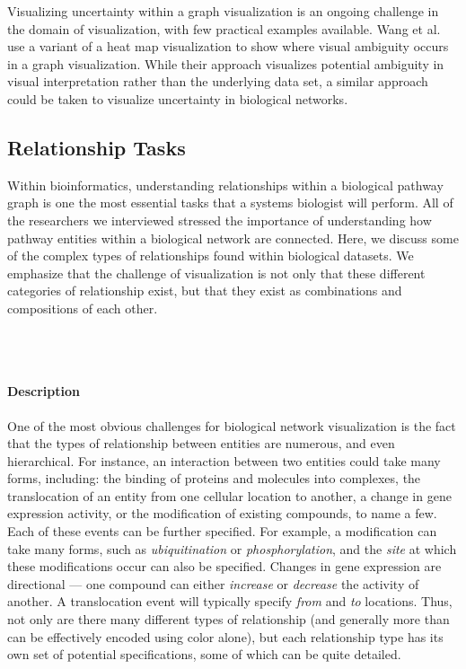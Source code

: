 \documentclass[twocolumn]{bmcart}%
\begin{document}
Visualizing uncertainty within a graph visualization is an ongoing challenge in the domain of visualization, with few practical examples available.
Wang et al.~\cite{wang2016ambiguityvis} use a variant of a heat map visualization to show where visual ambiguity occurs in a graph visualization.
While their approach visualizes potential ambiguity in visual interpretation rather than the underlying data set, a similar approach could be taken to visualize uncertainty in biological networks.

\subsection*{Relationship Tasks}

Within bioinformatics,  understanding relationships within a biological pathway graph is one the most essential tasks that a systems biologist will perform.
All of the researchers we interviewed stressed the importance of understanding how pathway entities within a biological network are connected.
Here, we discuss some of the complex types of relationships found within biological datasets.
We emphasize that the challenge of visualization is not only that these different categories of relationship exist, but that they exist as combinations and compositions of each other.

\ \\ \

\paragraph*{Description}

One of the most obvious challenges for biological network visualization is the fact that the types of relationship between entities are numerous, and even hierarchical.
For instance, an interaction between two entities could take many forms, including: the binding of proteins and molecules into complexes, the translocation of an entity from one cellular location to another, a change in gene expression activity, or the modification of existing compounds, to name a few.
Each of these events can be further specified.
For example, a modification can take many forms, such as \textit{ubiquitination} or \textit{phosphorylation}, and the \textit{site} at which these modifications occur can also be specified.
Changes in gene expression are directional --- one compound can either \textit{increase} or \textit{decrease} the activity of another.
A translocation event will typically specify \textit{from} and \textit{to} locations.
Thus, not only are there many different types of relationship (and generally more than can be effectively encoded using color alone), but each relationship type has its own set of potential specifications, some of which can be quite detailed.
\end{document}
